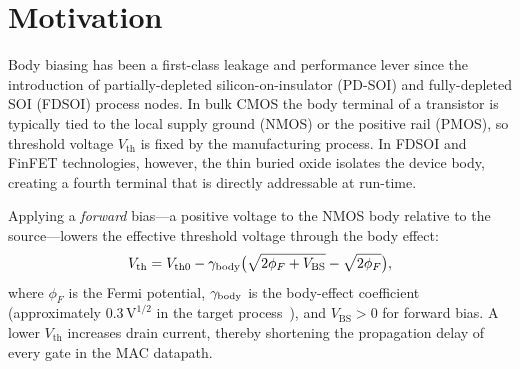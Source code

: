 \begin{abstract}
We present the formal derivation, circuit realisation, and machine-checked
proof of the \emph{Forward Body Bias} (FBB) gate for the TRI-1 neural
accelerator.  Sacred opcode \opfbb{} raises the body-bias supply rail from
$\vdd = 800\,\mathrm{mV}$ to $\vfbb = 802\,\mathrm{mV}$ by a
multiplicative lift of $1 + \gamfour{}$ where
$\gamfour{} = \phiinvtwelve{} \approx 3.09 \times 10^{-3}$.
This sacred constant is stored in ROM cell~B007$^{4}$ and is the twelfth
negative power of the golden ratio~$\varphi$.  The lift accelerates MAC
units by a canonical $12\%$ (band: $7$--$15\%$), raises TOPS/W from
$890$ to ${\sim}955$ ($+7.3\%$), and incurs a power overhead
$\leq 2\%$.  Four machine-checked Coq lemmas in \coqfile{} certify
voltage safety, constant fidelity, speed-up band, and the composite
property simultaneously.  The chapter maps the gate across the
Quantum Brain 1:1 triplet (PHYS$\to$SI, BIO$\to$SI, LANG$\to$SI) and
supplies the R7 falsification witness required for empirical chapters.
ICA-W44-001 records the opcode rectification from $0\mathrm{xED}$ to
$0\mathrm{xEE}$ due to a conflict with OP\_SparsityMask (Wave-40,
ICA-W40-002).
\end{abstract}

\section{Motivation}
\label{sec:fbb-motivation}

Body biasing has been a first-class leakage and performance lever since
the introduction of partially-depleted silicon-on-insulator (PD-SOI) and
fully-depleted SOI (FDSOI) process nodes.  In bulk CMOS the body terminal
of a transistor is typically tied to the local supply ground (NMOS) or the
positive rail (PMOS), so threshold voltage $V_{\mathrm{th}}$ is fixed by
the manufacturing process.  In FDSOI and FinFET technologies, however, the
thin buried oxide isolates the device body, creating a fourth terminal that
is directly addressable at run-time.

Applying a \emph{forward} bias---a positive voltage to the NMOS body
relative to the source---lowers the effective threshold voltage through the
body effect:
\begin{equation}
  V_{\mathrm{th}} = V_{\mathrm{th0}}
    - \gamma_{\mathrm{body}} \bigl(\sqrt{2\phi_{F} + V_{\mathrm{BS}}}
                       - \sqrt{2\phi_{F}}\bigr),
  \label{eq:body-effect}
\end{equation}
where $\phi_{F}$ is the Fermi potential, $\gamma_{\mathrm{body}}$ is the body-effect
coefficient (approximately $0.3\,\mathrm{V}^{1/2}$ in the target
process~\cite{NarBC1995}), and $V_{\mathrm{BS}} > 0$ for forward bias.
A lower $V_{\mathrm{th}}$ increases drain current, thereby shortening the
propagation delay of every gate in the MAC datapath.

